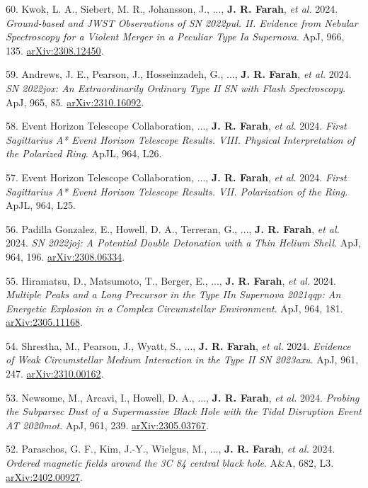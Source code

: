 \documentclass[margin,line]{res}
\newcommand{\apj}{ApJ}                    %
\newcommand{\apjl}{ApJL}                  %
\newcommand{\aap}{A\&A}                   %
\begin{document}
\begin{resume}
60. Kwok, L. A., Siebert, M. R., Johansson, J., ..., \textbf{J. R. Farah}, \textit{et al.} 2024. \textit{Ground-based and JWST Observations of SN 2022pul. II. Evidence from Nebular Spectroscopy for a Violent Merger in a Peculiar Type Ia Supernova}. \apj, 966, 135. \href{https://arxiv.org/abs/2308.12450}{arXiv:2308.12450}.

59. Andrews, J. E., Pearson, J., Hosseinzadeh, G., ..., \textbf{J. R. Farah}, \textit{et al.} 2024. \textit{SN 2022jox: An Extraordinarily Ordinary Type II SN with Flash Spectroscopy}. \apj, 965, 85. \href{https://arxiv.org/abs/2310.16092}{arXiv:2310.16092}.

58. Event Horizon Telescope Collaboration, ..., \textbf{J. R. Farah}, \textit{et al.} 2024. \textit{First Sagittarius A* Event Horizon Telescope Results. VIII. Physical Interpretation of the Polarized Ring}. \apjl, 964, L26.

57. Event Horizon Telescope Collaboration, ..., \textbf{J. R. Farah}, \textit{et al.} 2024. \textit{First Sagittarius A* Event Horizon Telescope Results. VII. Polarization of the Ring}. \apjl, 964, L25.

56. Padilla Gonzalez, E., Howell, D. A., Terreran, G., ..., \textbf{J. R. Farah}, \textit{et al.} 2024. \textit{SN 2022joj: A Potential Double Detonation with a Thin Helium Shell}. \apj, 964, 196. \href{https://arxiv.org/abs/2308.06334}{arXiv:2308.06334}.

55. Hiramatsu, D., Matsumoto, T., Berger, E., ..., \textbf{J. R. Farah}, \textit{et al.} 2024. \textit{Multiple Peaks and a Long Precursor in the Type IIn Supernova 2021qqp: An Energetic Explosion in a Complex Circumstellar Environment}. \apj, 964, 181. \href{https://arxiv.org/abs/2305.11168}{arXiv:2305.11168}.

54. Shrestha, M., Pearson, J., Wyatt, S., ..., \textbf{J. R. Farah}, \textit{et al.} 2024. \textit{Evidence of Weak Circumstellar Medium Interaction in the Type II SN 2023axu}. \apj, 961, 247. \href{https://arxiv.org/abs/2310.00162}{arXiv:2310.00162}.

53. Newsome, M., Arcavi, I., Howell, D. A., ..., \textbf{J. R. Farah}, \textit{et al.} 2024. \textit{Probing the Subparsec Dust of a Supermassive Black Hole with the Tidal Disruption Event AT 2020mot}. \apj, 961, 239. \href{https://arxiv.org/abs/2305.03767}{arXiv:2305.03767}.

52. Paraschos, G. F., Kim, J.-Y., Wielgus, M., ..., \textbf{J. R. Farah}, \textit{et al.} 2024. \textit{Ordered magnetic fields around the 3C 84 central black hole}. \aap, 682, L3. \href{https://arxiv.org/abs/2402.00927}{arXiv:2402.00927}.


\end{resume}
\end{document}
